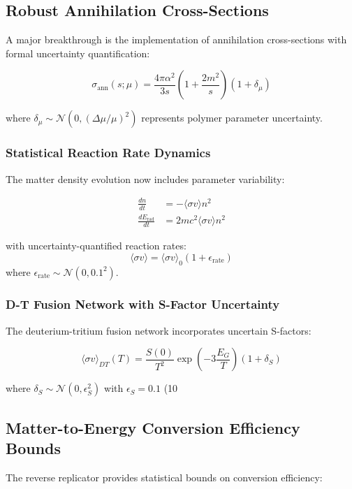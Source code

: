 \documentclass[11pt]{article}
\begin{document}
\subsection{Robust Annihilation Cross-Sections}
A major breakthrough is the implementation of annihilation cross-sections with formal uncertainty quantification:

\begin{equation}
\sigma_{\text{ann}}(s; \mu) = \frac{4\pi\alpha^2}{3s}\left(1 + \frac{2m^2}{s}\right)(1 + \delta_\mu)
\end{equation}

where $\delta_\mu \sim \mathcal{N}(0, (\Delta\mu/\mu)^2)$ represents polymer parameter uncertainty.

\subsubsection{Statistical Reaction Rate Dynamics}
The matter density evolution now includes parameter variability:

\begin{align}
\frac{dn}{dt} &= -\langle\sigma v\rangle n^2 \\
\frac{dE_{\text{rad}}}{dt} &= 2mc^2\langle\sigma v\rangle n^2
\end{align}

with uncertainty-quantified reaction rates:
\begin{equation}
\langle\sigma v\rangle = \langle\sigma v\rangle_0 (1 + \epsilon_{\text{rate}})
\end{equation}
where $\epsilon_{\text{rate}} \sim \mathcal{N}(0, 0.1^2)$.

\subsubsection{D-T Fusion Network with S-Factor Uncertainty}
The deuterium-tritium fusion network incorporates uncertain S-factors:

\begin{equation}
\langle\sigma v\rangle_{DT}(T) = \frac{S(0)}{T^2} \exp\left(-3\frac{E_G}{T}\right)(1 + \delta_S)
\end{equation}

where $\delta_S \sim \mathcal{N}(0, \epsilon_S^2)$ with $\epsilon_S = 0.1$ (10%

\subsection{Matter-to-Energy Conversion Efficiency Bounds}
The reverse replicator provides statistical bounds on conversion efficiency:
\end{document}
